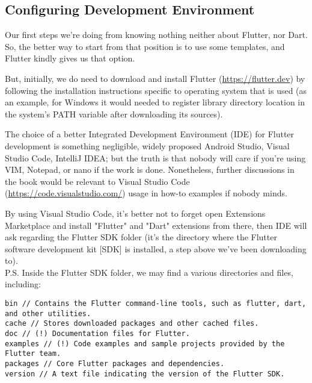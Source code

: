 
\subsection{Configuring Development Environment}

Our first steps we're doing from knowing nothing neither about Flutter, nor Dart. So, the better way to start from that
position is to use some templates, and Flutter kindly gives us that option.

But, initially, we do need to download and install Flutter (\href{https://flutter.dev}{https://flutter.dev}) by 
following the installation instructions specific to operating system that is used (as an example, for Windows it 
would needed to register library directory location in the system's PATH variable after downloading its sources).

The choice of a better Integrated Development Environment (IDE) for Flutter development is something negligible, widely
proposed Android Studio, Visual Studio Code, IntelliJ IDEA; but the truth is that nobody will care if you're using VIM,
Notepad, or nano if the work is done. Nonetheless, further discussions in the book would be relevant to Visual Studio 
Code (\href{https://code.visualstudio.com/}{https://code.visualstudio.com/}) usage in how-to examples if nobody minds.

By using Visual Studio Code, it's better not to forget open Extensions Marketplace and install "Flutter" and 
"Dart" extensions from there, then IDE will ask regarding the Flutter SDK folder (it's the directory 
where the Flutter software development kit [SDK] is installed, a step above we've been downloading to).
\\
\noindent P.S. Inside the Flutter SDK folder, we may find a various directories and files, including:

\begin{lstlisting}
bin // Contains the Flutter command-line tools, such as flutter, dart, and other utilities.
cache // Stores downloaded packages and other cached files.
doc // (!) Documentation files for Flutter.
examples // (!) Code examples and sample projects provided by the Flutter team.
packages // Core Flutter packages and dependencies.
version // A text file indicating the version of the Flutter SDK.
\end{lstlisting}

